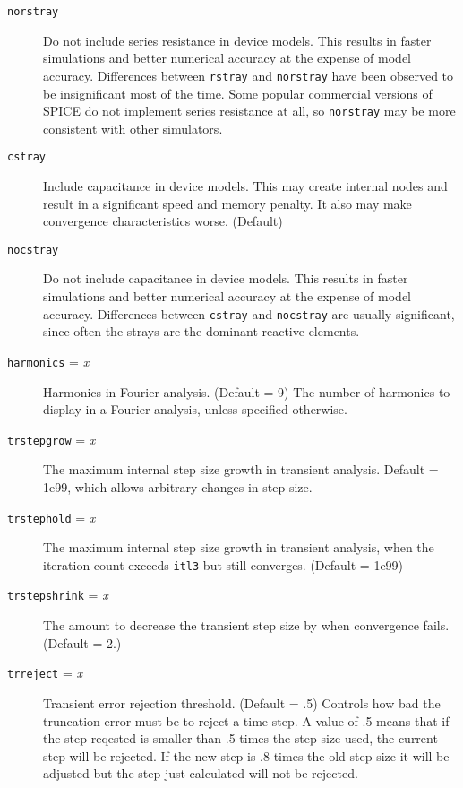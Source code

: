\begin{description}
\item[{\tt norstray}] Do not include series resistance in device
models.  This results in faster simulations and better numerical
accuracy at the expense of model accuracy.  Differences between
{\tt rstray} and {\tt norstray} have been observed to be insignificant
most of the time.  Some popular commercial versions of SPICE do
not implement series resistance at all, so {\tt norstray} may be
more consistent with other simulators.

\item[{\tt cstray}] Include capacitance in device models.  This may
create internal nodes and result in a significant speed and memory 
penalty.  It also may make convergence characteristics worse.  (Default)

\item[{\tt nocstray}] Do not include capacitance in device models.
This results in faster simulations and better numerical accuracy
at the expense of model accuracy.  Differences between {\tt cstray}
and {\tt nocstray} are usually significant, since often the strays
are the dominant reactive elements.

\item[{\tt harmonics} = {\it x}] Harmonics in Fourier analysis.
(Default = 9) The number of harmonics to display in a Fourier
analysis, unless specified otherwise.

\item[{\tt trstepgrow} = {\it x}]
The maximum internal step size growth in transient analysis.  Default
= 1e99, which allows arbitrary changes in step size.

\item[{\tt trstephold} = {\it x}]
The maximum internal step size growth in transient analysis, when the
iteration count exceeds {\tt itl3} but still converges.  (Default =
1e99)

\item[{\tt trstepshrink} = {\it x}]
The amount to decrease the transient step size by when convergence
fails.  (Default = 2.)

\item[{\tt trreject} = {\it x}] Transient error rejection threshold.
(Default = .5)  Controls how bad the truncation error must be to
reject a time step.  A value of .5 means that if the step reqested
is smaller than .5 times the step size used, the current step will
be rejected.  If the new step is .8 times the old step size it will
be adjusted but the step just calculated will not be rejected.


\end{description}
